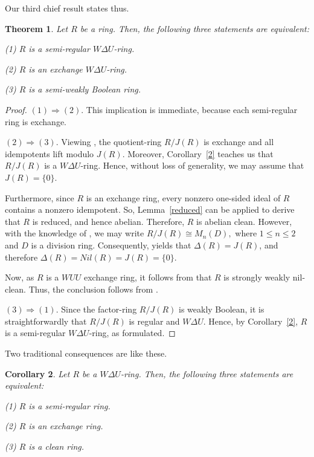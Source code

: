\documentclass[12pt]{amsart}
\newtheorem{theorem}{Theorem}[section]
\newtheorem{corollary}[theorem]{Corollary}
\theoremstyle{definition}
\begin{document}
\medskip

Our third chief result states thus.

\begin{theorem}\label{3.16}
Let $R$ be a ring. Then, the following three statements are equivalent:

(1) $R$ is a semi-regular $W\Delta U$-ring.

(2) $R$ is an exchange $W\Delta U$-ring.

(3) $R$ is a semi-weakly Boolean ring.
\end{theorem}

\begin{proof}
$(1) \Rightarrow (2)$. This implication is immediate, because each semi-regular ring is exchange.
	
$(2) \Rightarrow (3)$. Viewing \cite[Corollary~2.4]{8}, the quotient-ring $R/J(R)$ is exchange and all
idempotents lift modulo $J(R)$. Moreover, Corollary~\ref{2} teaches us that $R/J(R)$ is a $W\Delta U$-ring. Hence, without loss of generality, we may assume that $J(R)=\{0\}$.
	
Furthermore, since $R$ is an exchange ring, every nonzero one-sided ideal of $R$ contains a nonzero idempotent. So, Lemma~\ref{reduced} can be applied to derive that $R$ is reduced, and hence abelian. Therefore, $R$ is abelian clean. However, with the knowledge of \cite[Proposition~14]{9}, we may write
$
R/J(R)\cong M_{n}(D),
$
where $1\leq n\leq 2$ and $D$ is a division ring. Consequently, \cite[Theorem~11]{2} yields that $\Delta(R)=J(R)$, and therefore $\Delta(R)=Nil(R)=J(R)=\{0\}$.

Now, as $R$ is a $WUU$ exchange ring, it follows from \cite[Corollary~2.15]{wuu} that $R$ is strongly weakly nil-clean. Thus, the conclusion follows from \cite[Theorem~3.2]{ch}.
	
$(3) \Rightarrow (1)$. Since the factor-ring $R/J(R)$ is weakly Boolean, it is straightforwardly that $R/J(R)$ is regular and $W\Delta U$. Hence, by Corollary~\ref{2}, $R$ is a semi-regular $W\Delta U$-ring, as formulated.
\end{proof}

Two traditional consequences are like these.

\begin{corollary}\label{3.17}
Let $R$ be a $W\Delta U$-ring. Then, the following three statements are equivalent:

(1) $R$ is a semi-regular ring.

(2) $R$ is an exchange ring.

(3) $R$ is a clean ring.
\end{corollary}
\end{document}
